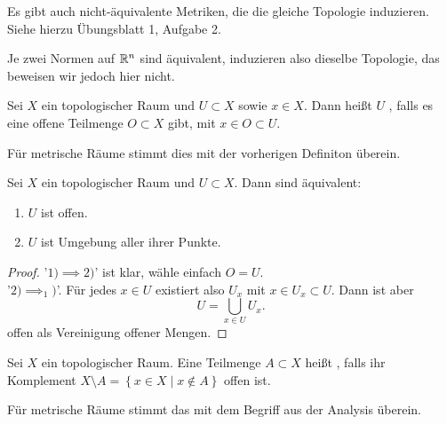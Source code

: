 \begin{remark}
    Es gibt auch nicht-äquivalente Metriken, die die gleiche Topologie induzieren. Siehe hierzu Übungsblatt 1, Aufgabe 2.
\end{remark}
\begin{remark}
    Je zwei Normen auf $\mathbb{R}^n$ sind äquivalent, induzieren also dieselbe Topologie, das beweisen wir jedoch hier nicht.
\end{remark}

\begin{definition}[Umgebung]\label{def:umgebung}
    Sei $X$ ein topologischer Raum und $U\subset X$ sowie $x\in X$. Dann heißt $U$ , falls es eine offene Teilmenge  $O\subset X$ gibt, mit $x\in O\subset U$.
\end{definition}
\begin{remark}
    Für metrische Räume stimmt dies mit der vorherigen Definiton überein.
\end{remark}


\begin{theorem}\label{thm:offene-menge-ist-umgebung-all-ihrer-punkte}
    Sei $X$ ein topologischer Raum und  $U\subset X$. Dann sind äquivalent:
    \begin{enumerate}[1)]
        \item $U$ ist offen.
        \item $U$ ist Umgebung aller ihrer Punkte.
    \end{enumerate}
\end{theorem}
\begin{proof}
    '$1) \implies 2)$' ist klar, wähle einfach $O = U$. \\
    '$2)\implies_1)$'. Für jedes $x\in U$ existiert also $U_x$ mit  $x\in U_x \subset U$. Dann ist aber
    \[
    U = \bigcup_{x\in U} U_x
    .\] 
    offen als Vereinigung offener Mengen.
\end{proof}

\begin{definition*}\label{def:abgeschlossene-menge}
    Sei $X$ ein topologischer Raum. Eine Teilmenge  $A\subset X$ heißt , falls ihr Komplement $X \setminus A = \left \{x\in X \mid  x\not\in A\right\} $ offen ist.
\end{definition*}
\begin{remark}
    Für metrische Räume stimmt das mit dem Begriff aus der Analysis überein.
\end{remark}

